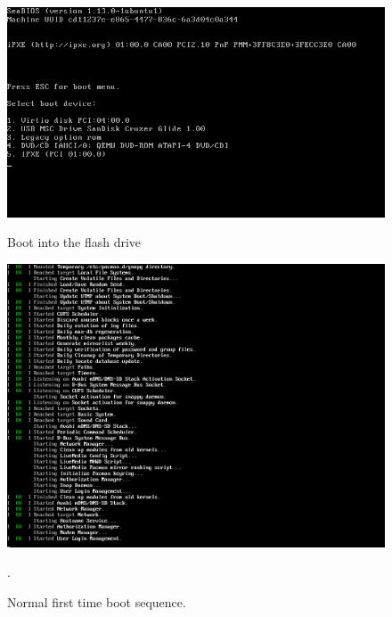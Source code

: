 \documentclass{article}
\begin{document}
\begin{figure}[ht!]
    \centering
    \begin{minipage}{0.5\textwidth}
        \includegraphics[width=.95\linewidth]{images/Boot_from_the_usb_this_is_different_on_all_devices.png}
        \caption{Boot into the flash drive}
        \label{fig:bootIntoFlash}
    \end{minipage}\hfill
    \centering
    \begin{minipage}{0.5\textwidth}
        \includegraphics[width=.95\linewidth]{images/manjaro_will_flash_some_text_as_it_gets_setup.png}
        \caption{Normal first time boot sequence.}.
        \label{fig:bootSequence}
    \end{minipage}\hfill
    \centering
    \begin{minipage}{0.5\textwidth}

\end{minipage}
\end{figure}
\end{document}

